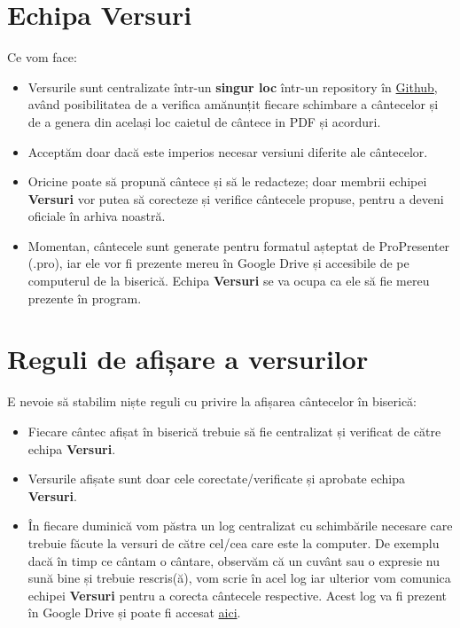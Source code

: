 \documentclass[epjST]{svjour}
\begin{document}
  \section{Echipa Versuri}
  \label{sec:4} Ce vom face:
  \begin{itemize}
    \item Versurile sunt centralizate într-un \textbf{singur loc} într-un
      repository în \href{https://github.com/ioanlucut/bes-lyrics}{Github}, având
      posibilitatea de a verifica amănunțit fiecare schimbare a cântecelor și de
      a genera din același loc caietul de cântece in PDF și acorduri.

    \item Acceptăm doar dacă este imperios necesar versiuni diferite ale cântecelor.

    \item Oricine poate să propună cântece și să le redacteze; doar membrii
      echipei \textbf{Versuri} vor putea să corecteze și verifice cântecele propuse,
      pentru a deveni oficiale în arhiva noastră.

    \item Momentan, cântecele sunt generate pentru formatul așteptat de
      ProPresenter (.pro), iar ele vor fi prezente mereu în Google Drive și
      accesibile de pe computerul de la biserică. Echipa \textbf{Versuri} se va
      ocupa ca ele să fie mereu prezente în program.
  \end{itemize}

  \section{Reguli de afișare a versurilor}
  \label{sec:5} E nevoie să stabilim niște reguli cu privire la afișarea
  cântecelor în biserică:
  \begin{itemize}
    \item Fiecare cântec afișat în biserică trebuie să fie centralizat și verificat
      de către echipa \textbf{Versuri}.

    \item Versurile afișate sunt doar cele corectate/verificate și aprobate echipa
      \textbf{Versuri}.

    \item În fiecare duminică vom păstra un log centralizat cu schimbările necesare
      care trebuie făcute la versuri de către cel/cea care este la computer. De
      exemplu dacă în timp ce cântam o cântare, observăm că un cuvânt sau o expresie
      nu sună bine și trebuie rescris(ă), vom scrie în acel log iar ulterior vom
      comunica echipei \textbf{Versuri} pentru a corecta cântecele respective. Acest
      log va fi prezent în Google Drive și poate fi accesat \href{https://docs.google.com/spreadsheets/d/1-YsjtGIwzpnJNoVPZ4vhv8DvmeUYrmwuhKL6a5BtzXc/edit?usp=drive_link}{aici}.
  \end{itemize}
\end{document}
